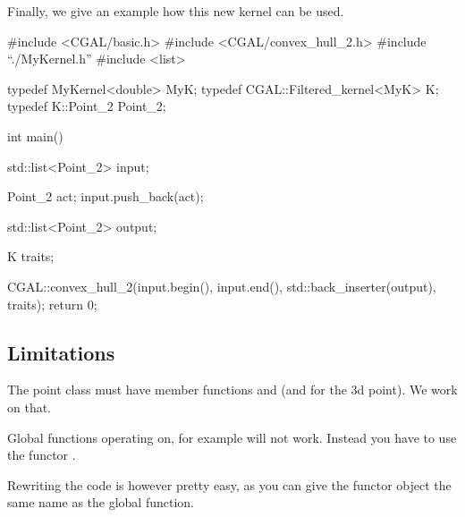 Finally, we give an example how this new kernel can be used.


\ccHtmlLinksOff
\begin{ccExampleCode}
#include <CGAL/basic.h>
#include <CGAL/convex_hull_2.h>
#include ``./MyKernel.h''
#include <list>

typedef MyKernel<double>           MyK;
typedef CGAL::Filtered_kernel<MyK> K;
typedef K::Point_2                 Point_2;

int main()
{
  std::list<Point_2> input;
  
  Point_2 act;
  input.push_back(act);

  std::list<Point_2> output;

  K  traits;

  CGAL::convex_hull_2(input.begin(), input.end(),
                      std::back_inserter(output), traits);		        
  return 0;
}
\end{ccExampleCode}

\ccHtmlLinksOn


\subsection{Limitations}

The point class must have member functions  and 
(and  for the 3d point). We work on that.

Global functions operating on, for example
 will not work. Instead you have to
use the functor .

Rewriting the code is however pretty easy, as you can give
the functor object the same name as the global function.

